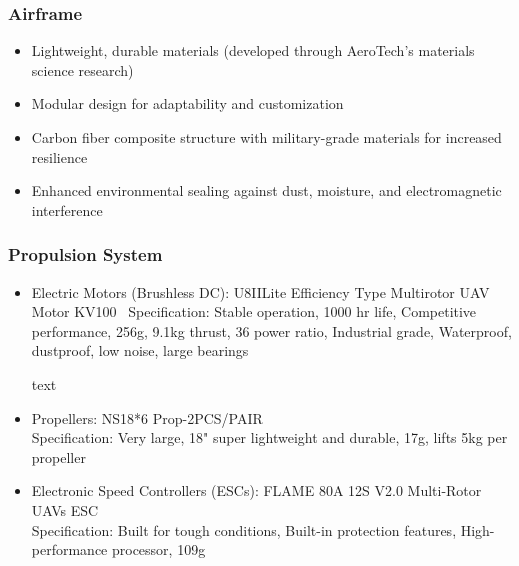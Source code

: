 \subsubsection{Airframe}
\begin{itemize}
\item Lightweight, durable materials (developed through AeroTech's materials science research)
\item Modular design for adaptability and customization
\item Carbon fiber composite structure with military-grade materials for increased resilience
\item Enhanced environmental sealing against dust, moisture, and electromagnetic interference
\end{itemize}

\subsubsection{Propulsion System}
\begin{itemize}
\item Electric Motors (Brushless DC):
U8IILite Efficiency Type Multirotor UAV Motor KV100 \
Specification: Stable operation, 1000 hr life, Competitive performance, 256g, 9.1kg thrust, 36 power ratio, Industrial grade, Waterproof, dustproof, low noise, large bearings

text
\item Propellers: 
NS18*6 Prop-2PCS/PAIR
\\ Specification: Very large, 18" super lightweight and durable, 17g, lifts 5kg per propeller

\item Electronic Speed Controllers (ESCs):
FLAME 80A 12S V2.0 Multi-Rotor UAVs ESC \\
Specification: Built for tough conditions, Built-in protection features, High-performance processor, 109g
\end{itemize}

